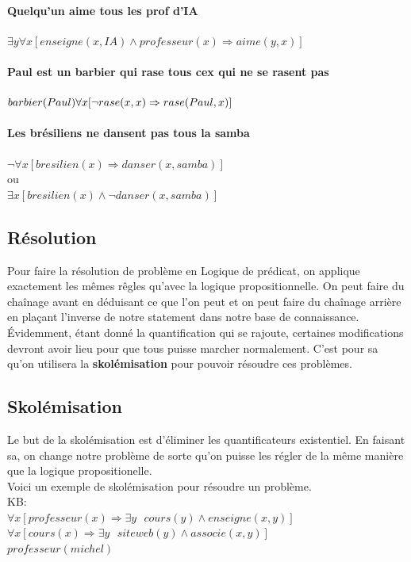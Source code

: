 \documentclass[oneside]{book}
\begin{document}
\paragraph{Quelqu'un aime tous les prof d'IA}$\exists y \forall x [enseigne(x, IA)\wedge professeur(x) \Rightarrow aime(y, x)]$
\paragraph{Paul est un barbier qui rase tous cex qui ne se rasent pas}
$barbier(Paul) \\ \forall x[\neg rase(x,x) \Rightarrow rase(Paul, x)]$ 
\paragraph{Les brésiliens ne dansent pas tous la samba}
$\neg \forall x [bresilien(x) \Rightarrow danser(x, samba)]$\\
ou \\
$\exists x [bresilien(x) \wedge \neg danser(x, samba)]$

\subsection{Résolution}
Pour faire la résolution de problème en Logique de prédicat, on applique exactement les mêmes rêgles qu'avec la logique propositionnelle. On peut faire du chaînage avant en déduisant ce que l'on peut et on peut faire du chaînage arrière en plaçant l'inverse de notre statement dans notre base de connaissance. Évidemment, étant donné la quantification qui se rajoute, certaines modifications devront avoir lieu pour que tous puisse marcher normalement. C'est pour sa qu'on utilisera la \textbf{skolémisation} pour pouvoir résoudre ces problèmes. 

\subsection{Skolémisation}
 Le but de la skolémisation est d'éliminer les quantificateurs existentiel. En faisant sa, on change notre problème de sorte qu'on puisse les régler de la même manière que la logique propositionelle.\\
 
Voici un exemple de skolémisation pour résoudre un problème.\\

\noindent KB:\\
$\forall x [professeur(x) \Rightarrow \exists y \text{ } cours(y) \wedge enseigne(x, y)]$\\
$\forall x [cours(x) \Rightarrow \exists y \text{ } siteweb(y) \wedge associe(x,y)]$\\
$professeur(michel)$\\
\end{document}

